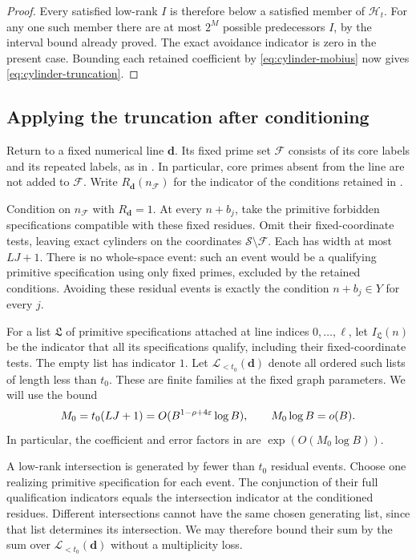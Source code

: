 \begin{proof}
Every satisfied low-rank $I$ is therefore below a satisfied member of
$\mathscr H_t$.  For any one such member there are at most $2^M$
possible predecessors $I$, by the interval bound already proved.
The exact avoidance indicator is zero in the present case.  Bounding
each retained coefficient by \eqref{eq:cylinder-mobius} now gives
\eqref{eq:cylinder-truncation}.
\end{proof}

\subsection{Applying the truncation after conditioning}

Return to a fixed numerical line $\boldsymbol d$.  Its fixed prime set
$\mathcal F$ consists of its core labels and its repeated labels, as in
.  In particular, core primes absent from the line
are not added to $\mathcal F$.  Write
$R_{\boldsymbol d}(n_{\mathcal F})$ for the indicator of the conditions
retained in .

Condition on $n_{\mathcal F}$ with $R_{\boldsymbol d}=1$.  At every
$n+b_j$, take the primitive forbidden specifications compatible with
these fixed residues.  Omit their fixed-coordinate tests, leaving
exact cylinders on the coordinates $\mathcal S\setminus\mathcal F$.
Each has width at most $LJ+1$.  There is no whole-space event: such an
event would be a qualifying primitive specification using only fixed
primes, excluded by the retained conditions.  Avoiding these residual
events is exactly the condition $n+b_j\in Y$ for every $j$.

For a list $\mathfrak L$ of primitive specifications attached at line
indices $0,\ldots,\ell$, let $I_{\mathfrak L}(n)$ be the indicator that
all its specifications qualify, including their fixed-coordinate
tests.  The empty list has indicator $1$.  Let
$\mathscr L_{<t_0}(\boldsymbol d)$ denote all ordered such lists of length
less than $t_0$.  These are finite families at the fixed graph
parameters.  We will use the bound
\begin{equation}\label{eq:cylinder-budget}
 M_0=t_0(LJ+1)=O(B^{1-\rho+4\varepsilon}\log B),\qquad
 M_0\log B=o(B).
\end{equation}
In particular, the coefficient and error factors in
 are $\exp(O(M_0\log B))$.

A low-rank intersection is generated by fewer than $t_0$ residual
events.  Choose one realizing primitive specification for each event.
The conjunction of their full qualification indicators equals the
intersection indicator at the conditioned residues.  Different
intersections cannot have the same chosen generating list, since that
list determines its intersection.  We may therefore bound their sum
by the sum over $\mathscr L_{<t_0}(\boldsymbol d)$ without a multiplicity
loss.

